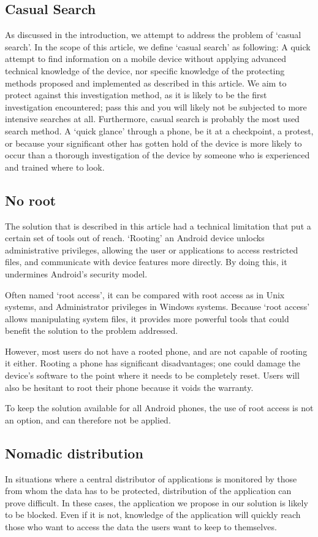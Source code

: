 \subsection{Casual Search}
As discussed in the introduction, we attempt to address the problem of `casual search'. 
In the scope of this article, we define `casual search' as following: A quick attempt to find information on a mobile device without applying advanced technical knowledge of the device, nor specific knowledge of the protecting methods proposed and implemented as described in this article.
We aim to protect against this investigation method, as it is likely to be the first investigation encountered; pass this and you will likely not be subjected to more intensive searches at all.
Furthermore, casual search is probably the most used search method. 
A `quick glance' through a phone, be it at a checkpoint, a protest, or because your significant other has gotten hold of the device is more likely to occur than a thorough investigation of the device by someone who is experienced and trained where to look.

\subsection{No root}
The solution that is described in this article had a technical limitation that put a certain set of tools out of reach.
`Rooting' an Android device unlocks administrative privileges, allowing the user or applications to access restricted files, and communicate with device features more directly.
By doing this, it undermines Android's security model\cite{vidas2011all}.

Often named `root access', it can be compared with root access as in Unix systems, and Administrator privileges in Windows systems.
Because `root access' allows manipulating system files, it provides more powerful tools that could benefit the solution to the problem addressed.

However, most users do not have a rooted phone, and are not capable of rooting it either. 
Rooting a phone has significant disadvantages; one could damage the device's software to the point where it needs to be completely reset.
Users will also be hesitant to root their phone because it voids the warranty.

To keep the solution available for all Android phones, the use of root access is not an option, and can therefore not be applied.

\subsection{Nomadic distribution}
In situations where a central distributor of applications is monitored by those from whom the data has to be protected, distribution of the application can prove difficult.
In these cases, the application we propose in our solution is likely to be blocked.
Even if it is not, knowledge of the application will quickly reach those who want to access the data the users want to keep to themselves.

